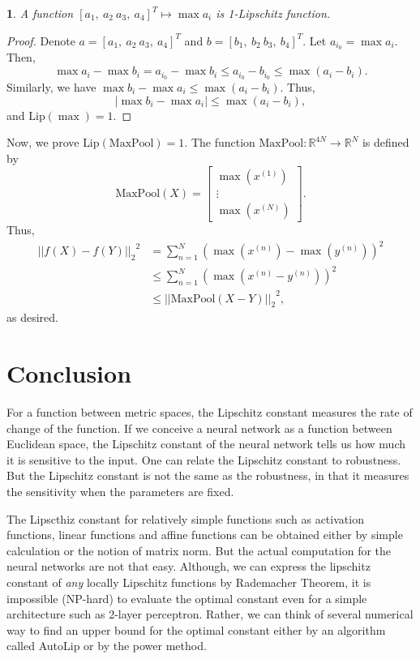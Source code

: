 \documentclass[12pt]{report}
\numberwithin{figure}{chapter}
\theoremstyle{plain}
\theoremstyle{definition}
\theoremstyle{corollary}
\theoremstyle{definition}
\theoremstyle{plain}
\theoremstyle{definition}
\theoremstyle{plain}
\newtheorem{lemma}[theorem]{\protect\lemmaname}
\providecommand{\lemmaname}{Lemma}
\newcommand\lip{\ensuremath{\text{Lip}}}
\begin{document}
\begin{lemma}\label{lemm:maxs_1_lipschitz}
A function \([a_1,\:a_2\:a_3,\:a_4]^T\mapsto\max a_i\) is 1-Lipschitz function.
\end{lemma}
\begin{proof}
Denote \(a=[a_1,\:a_2\:a_3,\:a_4]^T\) and \(b=[b_1,\:b_2\:b_3,\:b_4]^T\).
Let \(a_{i_0}=\max a_i\).
Then,
\[\max a_i-\max b_i=a_{i_0}-\max b_i\le a_{i_0}-b_{i_0}\le\max (a_i-b_i).\]
Similarly, we have \(\max b_i-\max a_i\le\max (a_i-b_i)\).
Thus,
\[\left|\max b_i-\max a_i\right|\le\max (a_i-b_i),\]
and \(\lip(\max)=1\).
\end{proof}

Now, we prove \(\lip(\text{MaxPool})=1\).
The function \(\text{MaxPool}:\mathbb R^{4N}\to\mathbb R^N\) is defined by
\[\text{MaxPool}(X)=\begin{bmatrix}\max \left(x^{(1)}\right)\\\vdots\\\max \left(x^{(N)}\right)\end{bmatrix}.\]
Thus,
\begin{align*}
{\left|\left|f(X)-f(Y)\right|\right|_2}^2
&=\sum_{n=1}^N\left(\max\left(x^{(n)}\right)-\max\left(y^{(n)}\right)\right)^2\\
&\le\sum_{n=1}^N\left(\max\left(x^{(n)}-y^{(n)}\right)\right)^2\\
&{\le\left|\left|\text{MaxPool}(X-Y)\right|\right|_2}^2,
\end{align*}
as desired.

\chapter{Conclusion}
For a function between metric spaces, the Lipschitz constant measures the rate of change of the function.
If we conceive a neural network as a function between Euclidean space, the Lipschitz constant of the neural network tells us how much it is sensitive to the input.
One can relate the Lipschitz constant to robustness.
But the Lipschitz constant is not the same as the robustness, in that it measures the sensitivity when the parameters are fixed.

The Lipscthiz constant for relatively simple functions such as activation functions, linear functions and affine functions can be obtained either by simple calculation or the notion of matrix norm.
But the actual computation for the neural networks are not that easy.
Although, we can express the lipschitz constant of \emph{any} locally Lipschitz functions by Rademacher Theorem, it is impossible (NP-hard) to evaluate the optimal constant even for a simple architecture such as 2-layer perceptron.
Rather, we can think of several numerical way to find an upper bound for the optimal constant either by an algorithm called AutoLip or by the power method.
\end{document}
